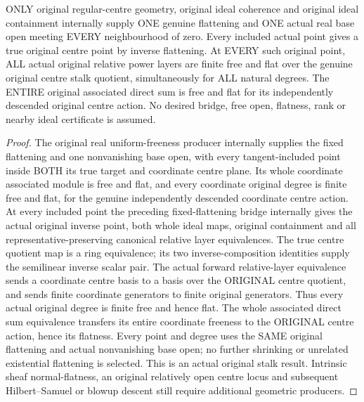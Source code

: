 \begin{theorem}
\label{hir:real-domain-original-all-nearby-relative-stalks-free-open}
\leanok
ONLY original regular-centre geometry, original ideal coherence and original
ideal containment internally supply ONE genuine flattening and ONE actual
real base open meeting EVERY neighbourhood of zero. Every included actual
point gives a true original centre point by inverse flattening. At EVERY
such original point, ALL actual original relative power layers are finite
free and flat over the genuine original centre stalk quotient, simultaneously
for ALL natural degrees. The ENTIRE original associated direct sum is free
and flat for its independently descended original centre action. No desired
bridge, free open, flatness, rank or nearby ideal certificate is assumed.
\end{theorem}
\begin{proof}
The original real uniform-freeness producer internally supplies the fixed
flattening and one nonvanishing base open, with every tangent-included point
inside BOTH its true target and coordinate centre plane. Its whole coordinate
associated module is free and flat, and every coordinate original degree is
finite free and flat, for the genuine independently descended coordinate
centre action. At every included point the preceding fixed-flattening bridge
internally gives the actual original inverse point, both whole ideal maps,
original containment and all representative-preserving canonical relative
layer equivalences. The true centre quotient map is a ring equivalence;
its two inverse-composition identities supply the semilinear inverse scalar
pair. The actual forward relative-layer equivalence sends a coordinate
centre basis to a basis over the ORIGINAL centre quotient, and sends finite
coordinate generators to finite original generators. Thus every actual
original degree is finite free and hence flat. The whole associated direct
sum equivalence transfers its entire coordinate freeness to the ORIGINAL
centre action, hence its flatness. Every point and degree uses the SAME
original flattening and actual nonvanishing base open; no further shrinking
or unrelated existential flattening is selected. This is an actual original
stalk result. Intrinsic sheaf normal-flatness, an original relatively open
centre locus and subsequent Hilbert--Samuel or blowup descent still require
additional geometric producers.
\end{proof}
